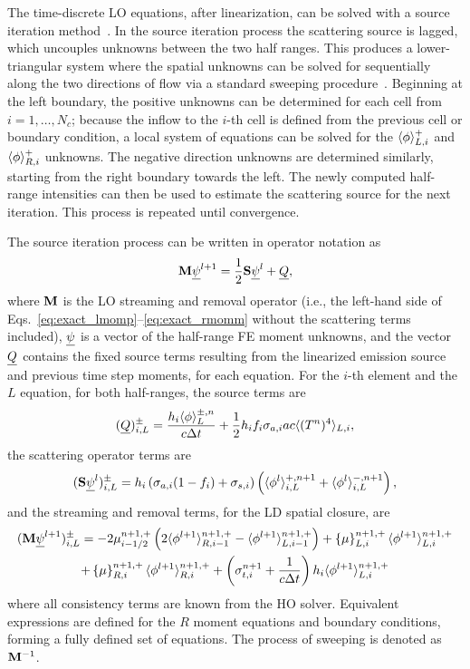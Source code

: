 The time-discrete LO equations, after linearization, can be solved with a source iteration
method~\cite{lewis,morel_dsa,mcclarren_notes}.  In the source iteration
process the scattering source is lagged, which
uncouples unknowns between the two half ranges.  This produces a lower-triangular
system where the spatial unknowns can be solved for sequentially along the two directions of flow via a
standard sweeping procedure~\cite{lewis,morel_ldtrt}.  Beginning at the left boundary, the
positive unknowns can be determined for each cell from $i=1,\ldots,N_c$; because the
inflow to the $i$-th cell is defined from the previous cell or boundary condition, a local system
of equations can be solved for the $\langle \phi \rangle_{L,i}^+$ and $\langle \phi \rangle_{R,i}^+$ unknowns.
The negative direction unknowns are
determined similarly, starting from the
right boundary towards the left.  The newly computed half-range
intensities can then be used to estimate the scattering source for the next iteration.  This
process is repeated until convergence.  

The source iteration process can be written in operator notation as
\begin{equation}
    \mathbf{M} \underline{\psi}^{l+1} = \frac{1}{2}\mathbf{S}\underline{\psi}^{l} + \underline{Q},
\end{equation}
where $\mathbf{M}$ is the LO streaming and removal operator (i.e., the left-hand side of
Eqs.~\eqref{eq:exact_lmomp}--\eqref{eq:exact_rmomm} without the scattering terms
included), $\underline{\psi}$ is a vector of the half-range FE moment unknowns, and the vector
$\underline{Q}$ contains the fixed source terms resulting from the linearized emission source and previous
time step moments, for each equation.  For the $i$-th element and the $L$
equation, for both half-ranges, the source terms are
\begin{equation}
    (\underline{Q})_{i,L}^\pm = \frac{h_i\langle \phi \rangle_L^{\pm,n}}{c\Delta t} + \frac{1}{2}h_if_i \sigma_{a,i} a c \langle 
        (T^{n})^4 \rangle_{L,i},
\end{equation}
the scattering operator terms are
\begin{equation}
    (\mathbf{S} \underline{\psi}^l)^{\pm}_{i,L} = h_i\left(\sigma_{a,i} (1-f_i) + \sigma_{s,i}\right)
    \left(\langle  \phi^l \rangle_{i,L}^{+,n+1} + \langle  \phi^l \rangle_{i,L}^{-,n+1}\right),
\end{equation}
and the streaming and removal terms, for the LD spatial closure, are
\begin{multline}
    (\mathbf{M} \underline{\psi}^{l+1})^{\pm}_{i,L} = 
    -2{\mu}_{i-1/2}^{n+1,+} \left(2\langle \phi^{l+1} \rangle_{R,i-1}^{n+1,+} -
    \langle \phi^{l+1} \rangle_{L,i-1}^{n+1,+} \right) +  \left\{ \mu \right\}_{L,i}^{n+1,+}
    \langle \phi^{l+1} \rangle_{L,i}^{n+1,+} \\
  +  \left\{ \mu \right\}_{R,i}^{n+1,+}
  \langle \phi^{l+1} \rangle_{R,i}^{n+1,+} +  \left(\sigma_{t,i}^{n+1}+\frac{1}{c \Delta t} \right) h_i 
  \langle \phi^{l+1} \rangle_{L,i}^{n+1,+}
\end{multline}
where all consistency terms are known from the HO solver.
Equivalent expressions are defined for the $R$ moment equations and boundary conditions,
forming a fully defined set of equations.  The process of sweeping is denoted as $\mathbf{M}^{-1}$.

